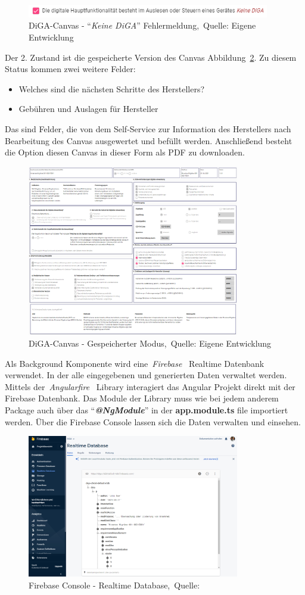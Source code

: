 \begin{figure}[H]
	\centering
	\includegraphics[width=400px, keepaspectratio]{assets/error2.png}
	\caption[DiGA-Canvas - ``\textit{Keine DiGA}'' Fehlermeldung]{DiGA-Canvas - ``\textit{Keine DiGA}'' Fehlermeldung,~Quelle: Eigene Entwicklung}
	\label{fig:nodigaerror}
\end{figure}
Der 2. Zustand ist die gespeicherte Version des Canvas Abbildung~\ref{fig:canvasonsave}. Zu diesem Status kommen zwei weitere Felder:
\begin{itemize}
	\item Welches sind die nächsten Schritte des Herstellers?
	\item Gebühren und Auslagen für Hersteller
\end{itemize}
 Das sind Felder, die von dem Self-Service zur Information des Herstellers nach Bearbeitung des Canvas ausgewertet und befüllt werden. Anschließend besteht die Option diesen Canvas in dieser Form als PDF zu downloaden.
  \begin{figure}[H]
  	\centering
  	\includegraphics[width=350px, keepaspectratio]{assets/onSave.png}
  	\caption[DiGA-Canvas - Gespeicherter Modus]{DiGA-Canvas - Gespeicherter Modus,~Quelle: Eigene Entwicklung}
  	\label{fig:canvasonsave}
  \end{figure}
\newpage
Als Background Komponente wird eine~\textit{Firebase}~\cite{firebase} Realtime Datenbank verwendet. In der alle eingegebenen und generierten Daten verwaltet werden. Mittels der~\textit{Angularfire}~\cite{angularfire} Library interagiert das Angular Projekt direkt mit der Firebase Datenbank. Das Module der Library muss wie bei jedem anderem Package auch über das ``\textbf{\textit{@NgModule}}'' in der \textbf{\text app.module.ts} file importiert werden. Über die Firebase Console lassen sich die Daten verwalten und einsehen.
  
    \begin{figure}[H]
  	\centering
  	\includegraphics[width=350px, keepaspectratio]{assets/firebaseConsole.png}
  	\caption[Firebase Console - Realtime Database]{Firebase Console - Realtime Database,~Quelle:~\cite{firebase}}
  \end{figure}